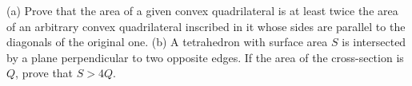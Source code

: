 (a) Prove that the area of a given convex quadrilateral is at least twice the area of an arbitrary convex quadrilateral inscribed in it whose sides are parallel to the diagonals of the original one.
(b) A tetrahedron with surface area $S$ is intersected by a plane perpendicular to two opposite edges. If the area of the cross-section is $Q$, prove that $S>4Q$.